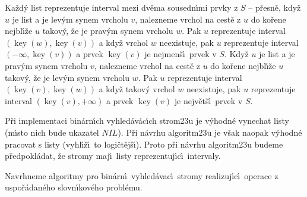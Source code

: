 \documentclass[a4paper,12pt]{article}
\DeclareMathOperator*{\key}{key}
\begin{document}
\flushpar Ka\v zd\'y list reprezentuje interval mezi dv\v ema 
sousedn\'\i mi prvky z $S$ -- p\v resn\v e, kdy\v z $u$ je list a je 
lev\'ym synem vrcholu $v$, nalezneme vrchol na cest\v e z $u$ 
do ko\v rene nejbl\'\i\v ze $u$ takov\'y, \v ze je prav\'ym synem 
vrcholu $w$. Pak $u$ repre\-zentuje interval $(\key(w),\key(v))$ a 
kdy\v z vrchol $w$ neexistuje, pak $u$ repre\-zentuje 
interval $(-\infty ,\key(v))$ a prvek $\key(v)$ je nej\-men\v s\'\i\ prvek v 
$S$.  Kdy\v z $u$ je list a je prav\'ym synem vrcholu $v$, 
nalezneme vrchol na cest\v e z $u$ do ko\v rene nejbl\'\i\v ze 
$u$ takov\'y, \v ze je lev\'ym synem vrcholu $w$. Pak $u$ repre\-zentuje 
interval $(\key(v),\key(w))$ a kdy\v z takov\'y vrchol $w$ neexistuje, 
pak $u$ repre\-zentuje interval $(\key(v),+\infty )$ a prvek $\key
(v)$ 
je nejv\v et\v s\'\i\ prvek v $S$.  
\medskip

\flushpar P\v ri implementaci bin\'arn\'\i ch vyhled\'av\'ac\'\i ch 
strom\accent23u je v\'yhodn\'e vynechat listy (m\'\i sto nich bude 
ukazatel $NIL$). P\v ri n\'avrhu algoritm\accent23u je v\v sak 
naopak v\'yhodn\'e 
pracovat s listy (vyhl\'\i\v z\'\i\ to logi\v ct\v ej\v s\'\i ). Proto p\v ri n\'avrhu 
algoritm\accent23u budeme p\v redpokl\'adat, \v ze stromy maj\'\i\ 
listy reprezentuj\'\i c\'\i\ intervaly.
\medskip

\flushpar Navrhneme algoritmy pro bin\'arn\'\i\ vyhled\'avac\'\i\ stromy 
rea\-lizuj\'\i\-c\'\i\ operace z uspo\v r\'adan\'eho slovn\'\i kov\'eho probl\'emu.
\medskip
\end{document}
